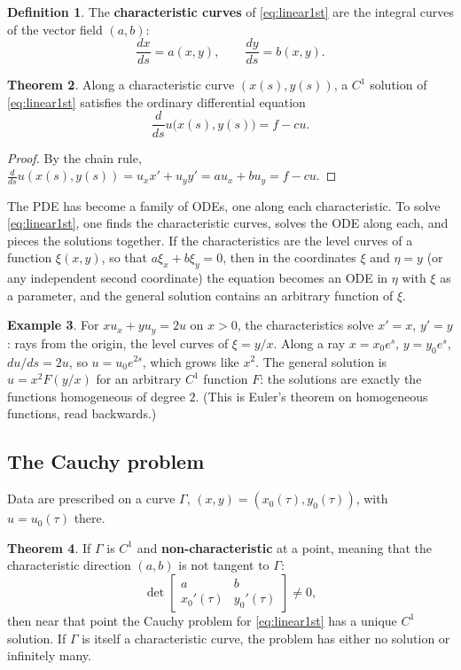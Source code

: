 \documentclass[11pt,a4paper]{article}
\numberwithin{equation}{section}
\theoremstyle{definition}
\newtheorem{thm}{Theorem}[subsection]
\newtheorem{defn}[thm]{Definition}
\newtheorem{exa}[thm]{Example}
\begin{document}
\begin{defn}
The \textbf{characteristic curves} of \eqref{eq:linear1st} are the integral curves of the vector field $(a, b)$:
\[
\frac{dx}{ds} = a(x, y), \qquad \frac{dy}{ds} = b(x, y) .
\]
\end{defn}

\begin{thm}
\label{thm:charode}
Along a characteristic curve $(x(s), y(s))$, a $C^1$ solution of \eqref{eq:linear1st} satisfies the ordinary differential equation
\[
\frac{d}{ds}u\bigl(x(s), y(s)\bigr) = f - cu .
\]
\end{thm}

\begin{proof}
By the chain rule, $\frac{d}{ds}u(x(s), y(s)) = u_xx' + u_yy' = au_x + bu_y = f - cu$.
\end{proof}

The PDE has become a family of ODEs, one along each characteristic. To solve \eqref{eq:linear1st}, one finds the characteristic curves, solves the ODE along each, and pieces the solutions
together. If the characteristics are the level curves of a function $\xi(x, y)$, so that $a\xi_x + b\xi_y = 0$, then in the coordinates $\xi$ and $\eta = y$ (or any independent second coordinate) the equation becomes
an ODE in $\eta$ with $\xi$ as a parameter, and the general solution contains an arbitrary function of $\xi$.

\begin{exa}
\label{ex:homogeneousfn}
For $xu_x + yu_y = 2u$ on $x > 0$, the characteristics solve $x' = x$, $y' = y$: rays from the origin, the level curves of $\xi = y/x$. Along a ray $x = x_0e^s$, $y = y_0e^s$, $du/ds = 2u$, so $u = u_0e^{2s}$, which grows like $x^2$.
The general solution is $u = x^2F(y/x)$ for an arbitrary $C^1$ function $F$: the solutions are exactly the functions homogeneous of degree $2$. (This is Euler's theorem on homogeneous functions,
read backwards.)
\end{exa}

\subsection{The Cauchy problem}
\label{ssec:cauchy}

Data are prescribed on a curve $\Gamma$, $(x, y) = (x_0(\tau), y_0(\tau))$, with $u = u_0(\tau)$ there.

\begin{thm}
\label{thm:cauchy1}
If $\Gamma$ is $C^1$ and \textbf{non-characteristic} at a point, meaning that the characteristic direction $(a, b)$ is not tangent to $\Gamma$:
\[
\det\begin{bmatrix} a & b\\ x_0'(\tau) & y_0'(\tau)\end{bmatrix} \neq 0 ,
\]
then near that point the Cauchy problem for \eqref{eq:linear1st} has a unique $C^1$ solution. If $\Gamma$ is itself a characteristic curve, the problem has either no solution or infinitely many.
\end{thm}
\end{document}
